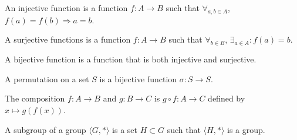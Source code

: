 \documentclass[crop=false,class=book]{standalone}
\begin{document}
\begin{definition}
An injective function is a function $f:A\rightarrow B$ such that $\forall_{a,b\in A}$, $f(a)=f(b)\Rightarrow a=b$.
\end{definition}
\begin{definition}
A surjective functions is a function $f:A\rightarrow B$ such that $\forall_{b\in B}$, $\exists_{a\in A}:f(a)=b$.
\end{definition}
\begin{definition}
A bijective function is a function that is both injective and surjective.
\end{definition}
\begin{definition}
A permutation on a set $S$ is a bijective function $\sigma:S\rightarrow S$.
\end{definition}
\begin{definition}
The composition $f:A\rightarrow B$ and $g:B\rightarrow C$ is $g\circ f:A\rightarrow C$ defined by $x\mapsto g(f(x))$.
\end{definition}
\begin{definition}
A subgroup of a group $\langle G,*\rangle$ is a set $H\subset G$ such that $\langle H,*\rangle$ is a group.
\end{definition}
\end{document}
